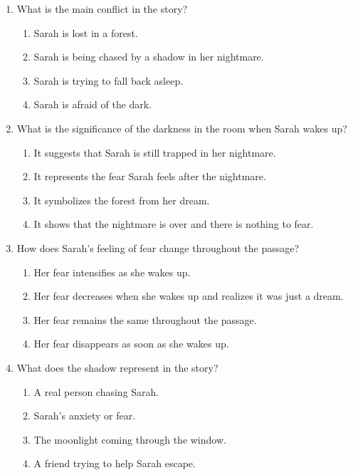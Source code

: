\documentclass[12pt]{article}
\begin{document}
\begin{enumerate}

    \item What is the main conflict in the story?
    \begin{enumerate}[label=\Alph*.]
        \item Sarah is lost in a forest.
        \item Sarah is being chased by a shadow in her nightmare.
        \item Sarah is trying to fall back asleep.
        \item Sarah is afraid of the dark.
    \end{enumerate}
    \vspace{0.5cm}

    \item What is the significance of the darkness in the room when Sarah wakes up?
    \begin{enumerate}[label=\Alph*.]
        \item It suggests that Sarah is still trapped in her nightmare.
        \item It represents the fear Sarah feels after the nightmare.
        \item It symbolizes the forest from her dream.
        \item It shows that the nightmare is over and there is nothing to fear.
    \end{enumerate}
    \vspace{0.5cm}

    \item How does Sarah’s feeling of fear change throughout the passage?
    \begin{enumerate}[label=\Alph*.]
        \item Her fear intensifies as she wakes up.
        \item Her fear decreases when she wakes up and realizes it was just a dream.
        \item Her fear remains the same throughout the passage.
        \item Her fear disappears as soon as she wakes up.
    \end{enumerate}
    \vspace{0.5cm}

    \item What does the shadow represent in the story?
    \begin{enumerate}[label=\Alph*.]
        \item A real person chasing Sarah.
        \item Sarah’s anxiety or fear.
        \item The moonlight coming through the window.
        \item A friend trying to help Sarah escape.
    \end{enumerate}
    \vspace{0.5cm}


\end{enumerate}
\end{document}
